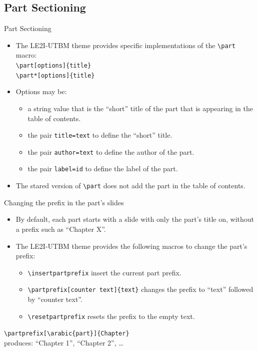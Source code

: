 \documentclass[english,sectioncirclenumberstyle]{le2iutbmbeamer}
\begin{document}
\subsection{Part Sectioning}

\begin{frame}{Part Sectioning}
	\begin{itemize}
	\item The LE2I-UTBM theme provides specific implementations of the \texttt{{\textbackslash}part} macro: \\
		\texttt{{\textbackslash}part[options]\{title\}} \\
		\texttt{{\textbackslash}part*[options]\{title\}}
	\vfill
	\item Options may be: \begin{itemize}
		\item a string value that is the ``short'' title of the part that is appearing in the table of contents.
		\item the pair \texttt{title=text} to define the ``short'' title.
		\item the pair \texttt{author=text} to define the author of the part.
		\item the pair \texttt{label=id} to define the label of the part.
		\end{itemize}
	\vfill
	\item The stared version of \texttt{{\textbackslash}part} does not add the part in the table of contents.
	\end{itemize}
\end{frame}

\begin{frame}{Changing the prefix in the part's slides}
	\begin{itemize}
	\item By default, each part starts with a slide with only the part's title on, without a prefix such as ``Chapter X''.
	\vfill
	\item The LE2I-UTBM theme provides the following macros to change the part's prefix:
		\begin{itemize}
		\item \texttt{{\textbackslash}insertpartprefix} insert the current part prefix.
		\item \texttt{{\textbackslash}partprefix[counter text]\{text\}} changes the prefix to ``text'' followed by ``counter text''.
		\item \texttt{{\textbackslash}resetpartprefix} resets the prefix to the empty text.
		\end{itemize}
	\end{itemize}
	\vfill
	\begin{example}
		\texttt{{\textbackslash}partprefix[{\textbackslash}arabic\{part\}]\{Chapter\}} \\
		produces: ``Chapter 1'', ``Chapter 2'', \dots
	\end{example}
\end{frame}
\end{document}
